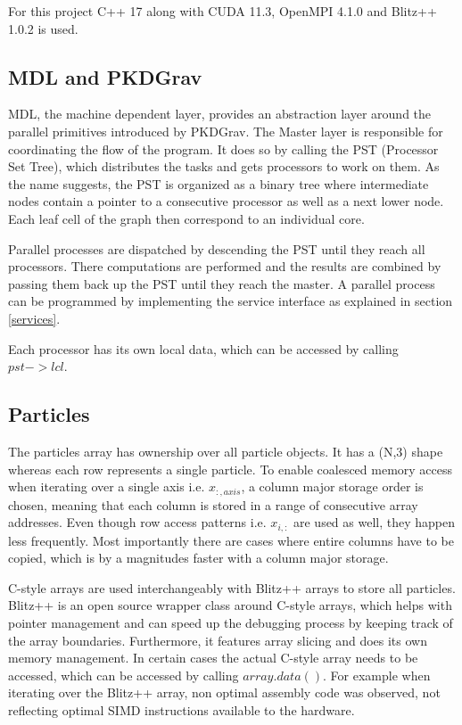 \documentclass[]{article}
\begin{document}
For this project C++ 17 along with CUDA 11.3, OpenMPI 4.1.0 and Blitz++ 1.0.2  \cite{blitzcpp} is used. 

\subsection{MDL and PKDGrav}

MDL, the machine dependent layer, provides an abstraction layer around the parallel primitives introduced by PKDGrav. The Master layer is responsible for coordinating the flow of the program. It does so by calling the PST (Processor Set Tree), which distributes the tasks and gets processors to work on them. As the name suggests, the PST is organized as a binary tree where intermediate nodes contain a pointer to a consecutive processor as well as a next lower node. Each leaf cell of the graph then correspond to an individual core. \cite{Stadel2001}

Parallel processes are dispatched by descending the PST until they reach all processors. There computations are performed and the results are combined by passing them back up the PST until they reach the master.
A parallel process can be programmed by implementing the service interface as explained in section \ref{services}.

Each processor has its own local data, which can be accessed by calling $pst->lcl$. 

\subsection{Particles}

The particles array has ownership over all particle objects. It has a (N,3) shape whereas each row represents a single particle. To enable coalesced memory access when iterating over a single axis i.e. $x_{:, axis}$, a column major storage order is chosen, meaning that each column is stored in a range of consecutive array addresses. Even though row access patterns i.e. $x_{i,:}$ are used as well, they happen less frequently. Most importantly there are cases where entire columns have to be copied, which is by a magnitudes faster with a column major storage.

C-style arrays are used interchangeably with Blitz++ arrays to store all particles. Blitz++ is an open source wrapper class around C-style arrays, which helps with pointer management and can speed up the debugging process by keeping track of the array boundaries. Furthermore, it features array slicing and does its own memory management. In certain cases the actual C-style array needs to be accessed, which can be accessed by calling $array.data()$. For example when iterating over the Blitz++ array, non optimal assembly code was observed, not reflecting optimal SIMD instructions available to the hardware. 
\end{document}
